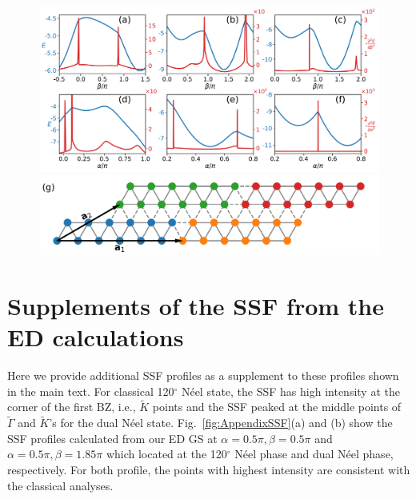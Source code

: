 \documentclass[aps,prb,reprint,amsfonts,amsmath,amssymb,showpacs,groupedaddress,superscriptaddress]{revtex4-1}
\begin{document}
{\begin{figure}
  \centering
  \includegraphics[width=\columnwidth]{SecondDerivatives26.pdf}
  \includegraphics[width=\columnwidth]{Cluster26.pdf}
\end{figure}
}

\section{\label{apx:SSF}Supplements of the SSF from the ED calculations}

Here we provide additional SSF profiles as a supplement to these profiles shown in the main text. For classical 120$^\circ$ N\'{e}el state, the SSF has high intensity at the corner of the first BZ, i.e., $\tilde{K}$ points and the SSF peaked at the middle points of $\tilde{\Gamma}$ and $\tilde{K}$'s for the dual N\'{e}el state. Fig.~\ref{fig:AppendixSSF}(a) and (b) show the SSF profiles calculated from our ED GS at $\alpha=0.5\pi, \beta=0.5\pi$ and $\alpha=0.5\pi, \beta=1.85\pi$ which located at the 120$^\circ$ N\'{e}el phase and dual N\'{e}el phase, respectively. For both profile, the points with highest intensity are consistent with the classical analyses.
\end{document}
